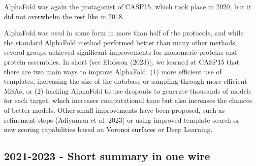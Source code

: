 \documentclass[
]{scrbook}
\begin{document}
AlphaFold was again the protagonist of CASP15, which took place in 2020,
but it did not overwhelm the rest like in 2018.

\begin{centering}\begin{tcolorbox}[hbox,
colframe=lightgray,
colback=white]

\textcolor{ProcessBlue}{{\Large {\faTwitterSquare}}} %

\href{https://twitter.com/sokrypton/status/1601596893355642882}{}

\end{tcolorbox}\end{centering}
\vspace{1em}

AlphaFold was used in some form in more than half of the protocols, and
while the standard AlphaFold method performed better than many other
methods, several groups achieved significant improvements for monomeric
proteins and protein assemblies. In short (see Elofsson (2023)), we
learned at CASP15 that there are two main ways to improve AlphaFold: (1)
more efficient use of templates, increasing the size of the database or
sampling through more efficient MSAs, or (2) hacking AlphaFold to use
dropouts to generate thousands of models for each target, which
increases computational time but also increases the chances of better
models. Other small improvements have been proposed, such as refinement
steps (Adiyaman et al. 2023) or using improved template search or new
scoring capabilities based on Voronoi surfaces or Deep Learning.

\subsection{\texorpdfstring{2021-2023 - Short summary in one
wire}{2021-2023 - Short summary in one  wire}}\label{short-summary-in-one-wire}

\begin{centering}\begin{tcolorbox}[hbox,
colframe=lightgray,
colback=white]

\textcolor{ProcessBlue}{{\Large {\faTwitterSquare}}} %

\href{https://twitter.com/simocristea/status/1626304239931912192}{}

\end{tcolorbox}\end{centering}
\vspace{1em}
\end{document}
